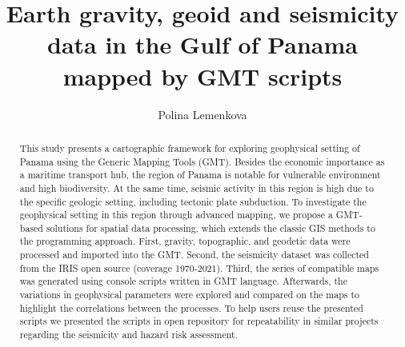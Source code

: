 \documentclass[USenglish,twocolumn]{article}
\begin{document}
 


  \author*[1]{Polina Lemenkova}


  \title{\huge Earth gravity, geoid and seismicity data in the Gulf of Panama mapped by GMT scripts}



  \begin{abstract}
{This study presents a cartographic framework for exploring geophysical setting of Panama using the Generic Mapping Tools (GMT). Besides the economic importance as a maritime transport hub, the region of Panama is notable for vulnerable environment and high biodiversity. At the same time, seismic activity in this region is high due to the specific geologic setting, including tectonic plate subduction. To investigate the geophysical setting in this region through advanced mapping, we propose a GMT-based solutions for spatial data processing, which extends the classic GIS methods to the programming approach. First, gravity, topographic, and geodetic data were processed and imported into the GMT. Second, the seismicity dataset was collected from the IRIS open source (coverage 1970-2021). Third, the series of compatible maps was generated using console scripts written in GMT language. Afterwards, the variations in geophysical parameters were explored and compared on the maps to highlight the correlations between the processes. To help users reuse the presented scripts we presented the scripts in open repository for repeatability in similar projects regarding the seismicity and hazard risk assessment.}
\end{abstract}


\end{document}

